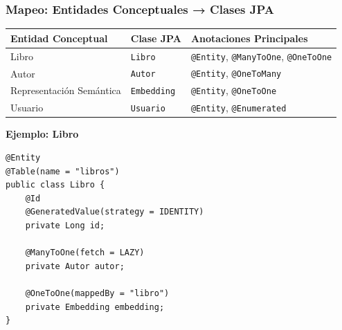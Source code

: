 \documentclass[aspectratio=169]{beamer}
\begin{document}
\begin{frame}
\frametitle{Mapeo: Entidades Conceptuales → Clases JPA}

\begin{table}
\centering
\tiny
\begin{tabular}{p{3cm}p{4cm}p{4cm}}
\toprule
\textbf{Entidad Conceptual} & \textbf{Clase JPA} & \textbf{Anotaciones Principales} \\
\midrule
Libro & \texttt{Libro} & \texttt{@Entity}, \texttt{@ManyToOne}, \texttt{@OneToOne} \\
Autor & \texttt{Autor} & \texttt{@Entity}, \texttt{@OneToMany} \\
Representación Semántica & \texttt{Embedding} & \texttt{@Entity}, \texttt{@OneToOne} \\
Usuario & \texttt{Usuario} & \texttt{@Entity}, \texttt{@Enumerated} \\
\bottomrule
\end{tabular}
\end{table}

\vspace{0.3cm}

\textbf{Ejemplo: Libro}
\begin{verbatim}
@Entity
@Table(name = "libros")
public class Libro {
    @Id
    @GeneratedValue(strategy = IDENTITY)
    private Long id;
    
    @ManyToOne(fetch = LAZY)
    private Autor autor;
    
    @OneToOne(mappedBy = "libro")
    private Embedding embedding;
}
\end{verbatim}

\end{frame}
\end{document}
